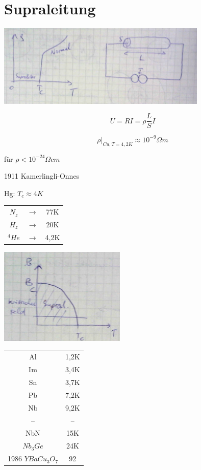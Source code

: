 


\tableofcontents
\setcounter{chapter}{12}
\chapter{Supraleitung}

\includegraphics[width=0.75\textwidth]{kap13_01.png}

\[U=RI = \rho\frac{L}{S}I\]

\[\left.\rho\right|_{Cu,T=4,2K}\approx 10^{-9}\Omega m\]

für \(\rho < 10^{-24}\Omega cm\)

1911 Kamerlingli-Onnes

Hg: \(T_c\approx 4K\)

\begin{tabular}{ccc}
  \(N_z\)&\(\rightarrow \)&77K\\
  \(H_z\)&\(\rightarrow \)&20K\\
  \(^4He\)&\(\rightarrow \)&4,2K\\
\end{tabular}

\includegraphics[width=0.45\textwidth]{kap13_02.png}

\begin{tabular}{cc}
  Al&1,2K\\
Im&3,4K\\
Sn&3,7K\\
Pb&7,2K\\
Nb&9,2K\\
--&--\\
NbN&15K\\
\(Nb_3Ge\)&24K\\
1986 \(YBaCu_3O_7\) & 92
\end{tabular}

